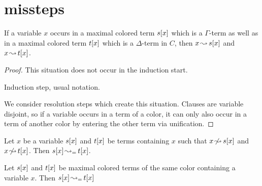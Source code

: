 \documentclass[,%
	paper=a4,%
	DIV11, %
	twoside=false,%
	liststotoc,
	bibtotoc,
	draft=false,%
	numbers=noendperiod
]{scrartcl}
\begin{document}
\section{missteps}
\begin{clemma}
	\label{lemma:arrow_from_one_color_to_other_color}
	If a variable $x$ occurs in a maximal colored term $s[x]$ which is a $\Gamma$-term as well as in a maximal colored term $t[x]$ which is a $\Delta$-term in $C$, then $x\operatorname{\leadsto} s[x]$ and $x\operatorname{\leadsto} t[x]$.
\end{clemma}
\begin{proof}
	This situation does not occur in the induction start.

	Induction step, usual notation.

	We consider resolution steps which create this situation. 
	Clauses are variable disjoint, so if a variable occurs in a term of a color, it can only also occur in a term of another color by entering the other term via unification.

\end{proof}


\begin{clemma}
	\label{wrong:same_color2}
	Let $x$ be a variable $s[x]$ and $t[x]$ be terms containing $x$ such that $x\operatorname{\not\leadsto} s[x]$ and $x\operatorname{\not\leadsto} t[x]$.
	\label{lemma:merge_arrow_between_same_colored_terms}
	Then $s[x] \operatorname{\leadsto_=} t[x]$.
\end{clemma}

\begin{clemma}
	\label{wrong:same_color}
	Let $s[x]$ and $t[x]$ be maximal colored terms of the same color containing a variable $x$. 
	Then $s[x] \operatorname{\leadsto_=} t[x]$
\end{clemma}
\end{document}
